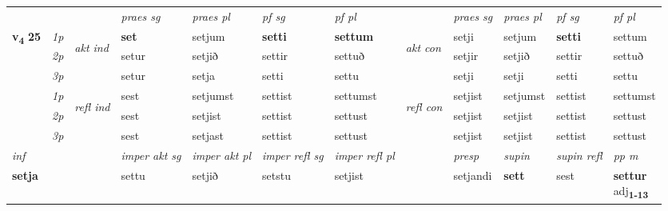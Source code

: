 \begin{longtable}[l]{X>{\footnotesize\itshape}llXXXXlXXXX}
 & &   & \textit{praes sg}  & \textit{praes pl}    & \textit{ pf sg} & \textit{pf pl} & & \textit{praes sg}  & \textit{praes pl}    & \textit{pf sg} & \textit{pf pl }  \\ \cmidrule{4-7} \cmidrule{9-12}
 \multirow{2}{*}{{{\textbf{v{\textsubscript{4}}} \Large{\textbf{25}}}}}  & 1p & \multirow{3}{*}{\begin{turn}{90}\textit{akt ind}\end{turn}} & \textbf{set} & setjum & \textbf{setti} & \textbf{settum} & \multirow{3}{*}{\begin{turn}{90}\textit{akt con}\end{turn}} &setji & setjum & \textbf{setti} & settum\\*
 & 2p &  &  setur  & setjið & settir & settuð & & setjir & setjið & settir & settuð \\*
 & 3p &  & setur & setja & setti & settu & & setji & setji& setti & settu \\*
\cmidrule{4-7} \cmidrule{9-12}
 & 1p & \multirow{3}{*}{\begin{turn}{90}\textit{refl ind}\end{turn}}  & sest & setjumst & settist & settumst & \multirow{3}{*}{\begin{turn}{90}\textit{refl con}\end{turn}}  &setjist & setjumst & settist & settumst \\*
 & 2p &  & sest & setjist & settist & settust & &setjist & setjist & settist & settust \\*
 & 3p  & & sest & setjast & settist & settust & & setjist & setjist& settist & settust \\*
\cmidrule{4-7} \cmidrule{9-12}

   {\textit{inf}} & &  & \textit{imper akt sg} & \textit{imper akt pl} & \textit{imper refl sg} & \textit{imper refl pl} && \textit{presp} & \textit{supin} & \textit{supin refl} & \textit{pp m} \\*
  {\textbf{setja}} & && settu  & setjið & setstu & setjist && setjandi &  \textbf{sett} & sest & \specialcell{\textbf{settur} \\ adj\textbf{\textsubscript{1-13}}} \\*

\midrule


\end{longtable}
